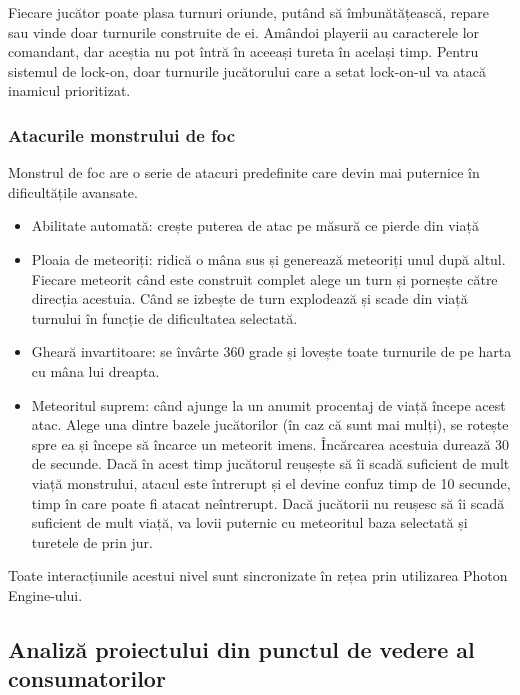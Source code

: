 \documentclass[12pt, a4paper]{article}
\begin{document}
	Fiecare jucător poate plasa turnuri oriunde, putând să îmbunătățească, repare sau vinde doar turnurile construite de ei. Amândoi playerii au caracterele lor comandant, dar aceștia nu pot întră în aceeași tureta în același timp. Pentru sistemul de lock-on, doar turnurile jucătorului care a setat lock-on-ul va atacă inamicul prioritizat.
	
	
	
	
	
	\subsubsection{Atacurile monstrului de foc}
	
	Monstrul de foc are o serie de atacuri predefinite care devin mai puternice în dificultățile avansate.
	
	\begin{itemize}
		\item Abilitate automată: crește puterea de atac pe măsură ce pierde din viață
		\item Ploaia de meteoriți: ridică o mâna sus și generează meteoriți unul după altul. Fiecare meteorit când este construit complet alege un turn și pornește către direcția acestuia. Când se izbește de turn explodează și scade din viață turnului în funcție de dificultatea selectată.
		\item Gheară invartitoare: se învârte 360 grade și lovește toate turnurile de pe harta cu mâna lui dreapta.
		\item Meteoritul suprem: când ajunge la un anumit procentaj de viață începe acest atac. Alege una dintre bazele jucătorilor (în caz că sunt mai mulți), se rotește spre ea și începe să încarce un meteorit imens. Încărcarea acestuia durează 30 de secunde. Dacă în acest timp jucătorul reușește să îi scadă suficient de mult viață monstrului, atacul este întrerupt și el devine confuz timp de 10 secunde, timp în care poate fi atacat neîntrerupt. Dacă jucătorii nu reușesc să îi scadă suficient de mult viață, va lovii puternic cu meteoritul baza selectată și turetele de prin jur.
	\end{itemize}
	
	Toate interacțiunile acestui nivel sunt sincronizate în rețea prin utilizarea Photon Engine-ului.
	
	
	
	
	
	\subsection{Analiză proiectului din punctul de vedere al consumatorilor}
	
\end{document}

